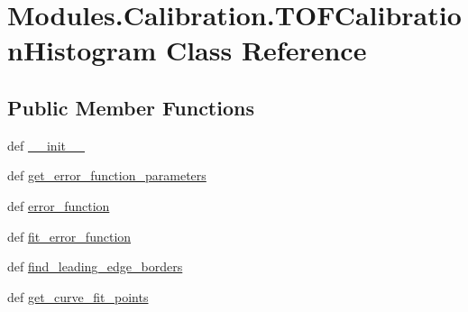 \hypertarget{classModules_1_1Calibration_1_1TOFCalibrationHistogram}{\section{Modules.\-Calibration.\-T\-O\-F\-Calibration\-Histogram Class Reference}
\label{classModules_1_1Calibration_1_1TOFCalibrationHistogram}
}
\subsection*{Public Member Functions}
\begin{DoxyCompactItemize}
\item 
def \hyperlink{classModules_1_1Calibration_1_1TOFCalibrationHistogram_ad02a325965687218e9859627cdadc2df}{\-\_\-\-\_\-init\-\_\-\-\_\-}
\item 
def \hyperlink{classModules_1_1Calibration_1_1TOFCalibrationHistogram_aab407cb8c02d7c638efc837e5d6d41c2}{get\-\_\-error\-\_\-function\-\_\-parameters}
\item 
def \hyperlink{classModules_1_1Calibration_1_1TOFCalibrationHistogram_a4e76506ba17b2dd68bc804d06a58995b}{error\-\_\-function}
\item 
def \hyperlink{classModules_1_1Calibration_1_1TOFCalibrationHistogram_af4ab8f7c8b22cbe6ff4fdf978e482d87}{fit\-\_\-error\-\_\-function}
\item 
def \hyperlink{classModules_1_1Calibration_1_1TOFCalibrationHistogram_a8a907f4125a5f05b05a130f053d73e7b}{find\-\_\-leading\-\_\-edge\-\_\-borders}
\item 
def \hyperlink{classModules_1_1Calibration_1_1TOFCalibrationHistogram_abf6068cc6d5625d5617b751be3e8b333}{get\-\_\-curve\-\_\-fit\-\_\-points}
\end{DoxyCompactItemize}
